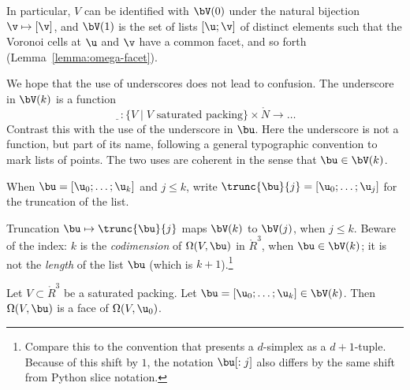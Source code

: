 In particular, $V$ can be identified with $\bV(0)$ under the natural
bijection $\v\mapsto[\v]$, and $\bV(1)$ is the set of lists $[\u;\v]$
of distinct elements such that the Voronoi cells at $ \u$ and $\v$
have a common facet, and so forth (Lemma~\ref{lemma:omega-facet}).  

\begin{notation}[underscore]
  We hope that the use of underscores does not lead to confusion.  The
  underscore in $\bV(k)$ is a function
\begin{displaymath} 
\underline{\phantom V}:\{V \mid \text{$V$ saturated packing} \}
\times \ring{N} \to \ldots
\end{displaymath}
Contrast this with the use of the underscore in $\bu$.  Here the
underscore is not a function, but part of its name, following a
general typographic convention to mark lists of points. The two uses
are coherent in the sense that $\bu\in\bV(k)$.
\end{notation}

\begin{notation}[$\trunc{\bu}{j}$]
When $\bu=[\u_0;\ldots;\u_k]$ and $j\le k$, write
$\trunc{\bu}{j} = 
[\u_0;\ldots;\u_j]$ for the truncation of the list.  
%
\end{notation}

Truncation $\bu\mapsto\trunc{\bu}{j}$ maps $\bV(k)$ to $\bV(j)$, when
$j\le k$.  Beware of the index: $k$ is the {\it codimension} of
$\Omega(V,\bu)$ in $\ring{R}^3$, when $\bu\in \bV(k)$; it is not the
{\it length} of the list $\bu$ (which is $k+1$).\footnote{Compare this
  to the convention that presents a $d$-simplex as a $d+1$-tuple.
  Because of this shift by $1$, the notation $\bu[:j]$ also differs by
  the same shift from Python slice notation.}


\begin{lemma}[]\label{lemma:omega-face}  
Let $V\subset\ring{R}^3$ be a saturated packing.
Let $\bu=[\u_0;\ldots;\u_{k}]\in \bV(k)$.  
Then $\Omega(V,\bu)$ is a face of $\Omega(V,\u_0)$.
\end{lemma}

